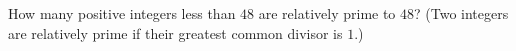 How many positive integers less than $48$ are relatively prime to $48$? (Two integers are relatively prime if their greatest common divisor is $1$.)
